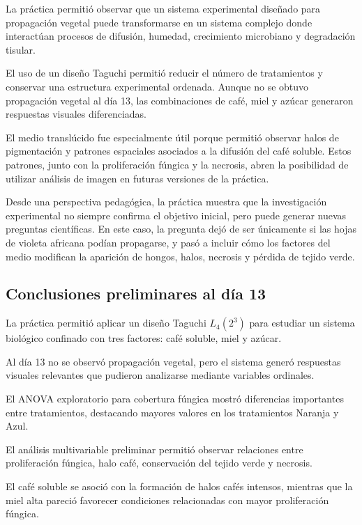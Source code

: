 La práctica permitió observar que un sistema experimental diseñado para propagación vegetal puede transformarse en un sistema complejo donde interactúan procesos de difusión, humedad, crecimiento microbiano y degradación tisular.

El uso de un diseño Taguchi permitió reducir el número de tratamientos y conservar una estructura experimental ordenada. Aunque no se obtuvo propagación vegetal al día 13, las combinaciones de café, miel y azúcar generaron respuestas visuales diferenciadas.

El medio translúcido fue especialmente útil porque permitió observar halos de pigmentación y patrones espaciales asociados a la difusión del café soluble. Estos patrones, junto con la proliferación fúngica y la necrosis, abren la posibilidad de utilizar análisis de imagen en futuras versiones de la práctica.

Desde una perspectiva pedagógica, la práctica muestra que la investigación experimental no siempre confirma el objetivo inicial, pero puede generar nuevas preguntas científicas. En este caso, la pregunta dejó de ser únicamente si las hojas de violeta africana podían propagarse, y pasó a incluir cómo los factores del medio modifican la aparición de hongos, halos, necrosis y pérdida de tejido verde.

\subsection{Conclusiones preliminares al día 13}

La práctica permitió aplicar un diseño Taguchi \(L_4(2^3)\) para estudiar un sistema biológico confinado con tres factores: café soluble, miel y azúcar.

Al día 13 no se observó propagación vegetal, pero el sistema generó respuestas visuales relevantes que pudieron analizarse mediante variables ordinales.

El ANOVA exploratorio para cobertura fúngica mostró diferencias importantes entre tratamientos, destacando mayores valores en los tratamientos Naranja y Azul.

El análisis multivariable preliminar permitió observar relaciones entre proliferación fúngica, halo café, conservación del tejido verde y necrosis.

El café soluble se asoció con la formación de halos cafés intensos, mientras que la miel alta pareció favorecer condiciones relacionadas con mayor proliferación fúngica.

